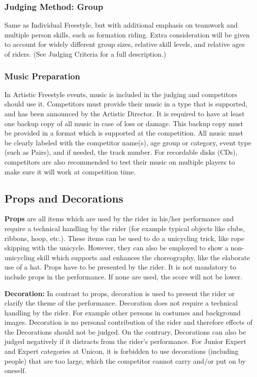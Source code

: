 \subsubsection{Judging Method: Group}
Same as Individual Freestyle, but with additional emphasis on teamwork and multiple person skills, such as formation riding.
Extra consideration will be given to account for widely different group sizes, relative skill levels, and relative ages of riders.
(See Judging Criteria for a full description.)

\subsubsection{Music Preparation}
\label{sec:freestyle_music}
In Artistic Freestyle events, music is included in the judging and competitors should use it.
Competitors must provide their music in a type that is supported, and has been announced by the Artistic Director.
It is required to have at least one backup copy of all music in case of loss or damage.
This backup copy must be provided in a format which is supported at the competition.
All music must be clearly labeled with the competitor name(s), age group or category, event type (such as Pairs), and if needed, the track number.
For recordable disks (CDs), competitors are also recommended to test their music on multiple players to make sure it will work at competition time.

\subsection{Props and Decorations \label{subsec:freestyle_freestyle-rules_individual-freestyle-overview_props-and-decorations}}

\textbf{Props} are all items which are used by the rider in his/her performance and require a technical handling by the rider (for example typical objects like clubs, ribbons, hoop, etc.).
These items can be used to do a unicycling trick, like rope skipping with the unicycle.
However, they can also be employed to show a non-unicycling skill which supports and enhances the choreography, like the elaborate use of a hat.
Props have to be presented by the rider.
It is not mandatory to include props in the performance.
If none are used, the score will not be lower.

\textbf{Decoration:} In contrast to props, decoration is used to present the rider or clarify the theme of the performance.
Decoration does not require a technical handling by the rider.
For example other persons in costumes and background images.
Decoration is no personal contribution of the rider and therefore effects of the Decorations should not be judged.
On the contrary, Decorations can also be judged negatively if it distracts from the rider's performance.
For Junior Expert and Expert categories at Unicon, it is forbidden to use decorations (including people) that are too large, which the competitor cannot carry and/or put on by oneself.

